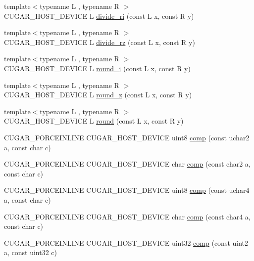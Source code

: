 \begin{DoxyCompactItemize}
\item 
{\footnotesize template$<$typename L , typename R $>$ }\\C\+U\+G\+A\+R\+\_\+\+H\+O\+S\+T\+\_\+\+D\+E\+V\+I\+CE L \hyperlink{group___basic_utils_gabb6714186dbbd864f0a9298944ba509b}{divide\+\_\+ri} (const L x, const R y)
\item 
{\footnotesize template$<$typename L , typename R $>$ }\\C\+U\+G\+A\+R\+\_\+\+H\+O\+S\+T\+\_\+\+D\+E\+V\+I\+CE L \hyperlink{group___basic_utils_gae5973146d12ab34b3cdf518c2ea0d14b}{divide\+\_\+rz} (const L x, const R y)
\item 
{\footnotesize template$<$typename L , typename R $>$ }\\C\+U\+G\+A\+R\+\_\+\+H\+O\+S\+T\+\_\+\+D\+E\+V\+I\+CE L \hyperlink{group___basic_utils_gab417c685b4c9fc81ccb34e970d4fbc7d}{round\+\_\+i} (const L x, const R y)
\item 
{\footnotesize template$<$typename L , typename R $>$ }\\C\+U\+G\+A\+R\+\_\+\+H\+O\+S\+T\+\_\+\+D\+E\+V\+I\+CE L \hyperlink{group___basic_utils_ga40a1778d81e29db2dd88253a284b0c62}{round\+\_\+z} (const L x, const R y)
\item 
{\footnotesize template$<$typename L , typename R $>$ }\\C\+U\+G\+A\+R\+\_\+\+H\+O\+S\+T\+\_\+\+D\+E\+V\+I\+CE L \hyperlink{group___basic_utils_ga6d264db70d9d9d514ced6ae7e74372ff}{round} (const L x, const R y)
\item 
C\+U\+G\+A\+R\+\_\+\+F\+O\+R\+C\+E\+I\+N\+L\+I\+NE C\+U\+G\+A\+R\+\_\+\+H\+O\+S\+T\+\_\+\+D\+E\+V\+I\+CE uint8 \hyperlink{group___basic_gae73662ac7ace330f8b3f726381785f28}{comp} (const uchar2 a, const char c)
\item 
C\+U\+G\+A\+R\+\_\+\+F\+O\+R\+C\+E\+I\+N\+L\+I\+NE C\+U\+G\+A\+R\+\_\+\+H\+O\+S\+T\+\_\+\+D\+E\+V\+I\+CE char \hyperlink{group___basic_ga8496934a659f5521de74af54b0805e37}{comp} (const char2 a, const char c)
\item 
C\+U\+G\+A\+R\+\_\+\+F\+O\+R\+C\+E\+I\+N\+L\+I\+NE C\+U\+G\+A\+R\+\_\+\+H\+O\+S\+T\+\_\+\+D\+E\+V\+I\+CE uint8 \hyperlink{group___basic_gaa695cfa1e048a121c9cbdf1e543d7f1b}{comp} (const uchar4 a, const char c)
\item 
C\+U\+G\+A\+R\+\_\+\+F\+O\+R\+C\+E\+I\+N\+L\+I\+NE C\+U\+G\+A\+R\+\_\+\+H\+O\+S\+T\+\_\+\+D\+E\+V\+I\+CE char \hyperlink{group___basic_gac54a46b198c76c9c29ccfca71fb5a71b}{comp} (const char4 a, const char c)
\item 
C\+U\+G\+A\+R\+\_\+\+F\+O\+R\+C\+E\+I\+N\+L\+I\+NE C\+U\+G\+A\+R\+\_\+\+H\+O\+S\+T\+\_\+\+D\+E\+V\+I\+CE uint32 \hyperlink{group___basic_ga5831bedd2e38ee10534adde39ab79f2c}{comp} (const uint2 a, const uint32 c)

\end{DoxyCompactItemize}
